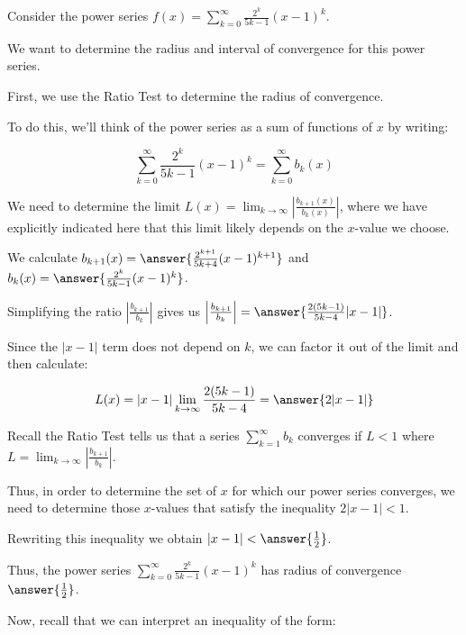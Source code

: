 \documentclass{ximera}
\author{Jim Talamo}
\begin{document}
\begin{exercise}
Consider the power series $f(x) = \sum_{k=0}^{\infty} \frac{2^k}{5k-1}(x-1)^{k}$.

We want to determine the radius and interval of convergence for this power series. 

First, we use the Ratio Test to determine the radius of convergence. 

To do this, we'll think of the power series as a sum of functions of $x$ by writing: 

\[
\sum_{k=0}^{\infty} \frac{2^k}{5k-1}(x-1)^{k} = \sum_{k=0}^{\infty} b_k(x)
\]

We need to determine the limit $L(x) = \lim_{k \to \infty} \left| \frac{b_{k+1}(x)}{b_k(x)}\right|$, where we have explicitly indicated here that this limit likely depends on the $x$-value we choose. 

We calculate $b_{k+1}(x)=\answer{\frac{2^{k+1}}{5k+4}(x-1)^{k+1}}$ and $b_k(x)=\answer{\frac{2^k}{5k-1}(x-1)^k}$. 

\begin{exercise}

Simplifying the ratio $\left|\frac{b_{k+1}}{b_k}\right|$ gives us $\left|\frac{b_{k+1}}{b_k}\right|=\answer{\frac{2(5k-1)}{5k-4} |x-1|}$.


\begin{exercise}

Since the $|x-1|$ term does not depend on $k$, we can factor it out of the limit and then calculate:

\[
L(x) = |x-1| \lim_{k \to \infty}   \frac{2(5k-1)}{5k-4}  =\answer{2 |x-1|}
\]

\begin{exercise}

Recall the Ratio Test tells us that a series $\sum^{\infty}_{k=1} b_k$ converges if $L <1$ where $L=\lim_{k \to \infty}\left| \frac{b_{k+1}}{b_k}\right|$. 

Thus, in order to determine the set of $x$ for which our power series converges, we need to determine those $x$-values that satisfy the inequality $2|x-1| <1$. 

Rewriting this inequality we obtain $|x-1|< \answer{\frac{1}{2}}$. 

Thus, the  power series $\sum_{k=0}^{\infty} \frac{2^k}{5k-1}(x-1)^{k}$ has radius of convergence $\answer{\frac{1}{2}}$.

\begin{exercise}

Now, recall that we can interpret an inequality of the form:


\end{exercise}
\end{exercise}
\end{exercise}
\end{exercise}
\end{exercise}
\end{document}
